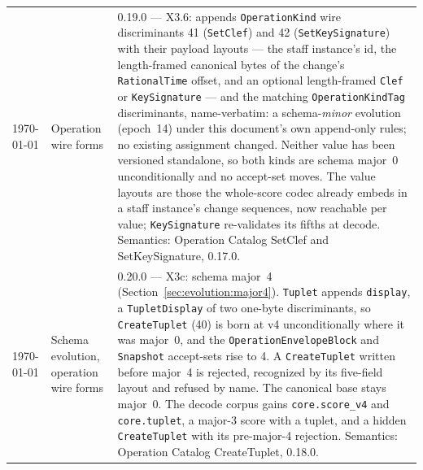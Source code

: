 \documentclass[11pt,letterpaper]{report}
\newcommand{\tablenums}[1]{{\addfontfeatures{Numbers={Lining,Tabular}}#1}}
\newcommand{\sectionsc}[1]{{\addfontfeatures{Letters=SmallCaps}#1}}
\begin{document}
\begin{longtable}{p{2cm} p{2.5cm} p{9cm}}
    \today & Operation wire forms & 0.19.0 --- X3.6: appends
  \texttt{OperationKind} wire discriminants \tablenums{41}
  (\texttt{SetClef}) and \tablenums{42} (\texttt{SetKeySignature}) with
  their payload layouts --- the staff instance's id, the length-framed
  canonical bytes of the change's \texttt{RationalTime} offset, and an
  optional length-framed \texttt{Clef} or \texttt{KeySignature} --- and the
  matching \texttt{OperationKindTag} discriminants, name-verbatim: a
  schema-\emph{minor} evolution (epoch~14) under this document's own
  append-only rules; no existing assignment changed. Neither value has been
  versioned standalone, so both kinds are schema major~0 unconditionally and
  no accept-set moves. The value layouts are those the whole-score codec
  already embeds in a staff instance's change sequences, now reachable per
  value; \texttt{KeySignature} re-validates its fifths at decode. Semantics:
  Operation Catalog \sectionsc{SetClef and SetKeySignature}, 0.17.0. \\

    \today & Schema evolution, operation wire forms & 0.20.0 --- X3c:
  schema major~4 (Section~\ref{sec:evolution:major4}). \texttt{Tuplet}
  appends \texttt{display}, a \texttt{TupletDisplay} of two one-byte
  discriminants, so \texttt{CreateTuplet} (\tablenums{40}) is born at v4
  unconditionally where it was major~0, and the
  \texttt{OperationEnvelopeBlock} and \texttt{Snapshot} accept-sets rise to
  \tablenums{4}. A \texttt{CreateTuplet} written before major~4 is rejected,
  recognized by its five-field layout and refused by name. The canonical base
  stays major~0. The decode corpus gains \texttt{core.score\_v4} and
  \texttt{core.tuplet}, a major-3 score with a tuplet, and a hidden
  \texttt{CreateTuplet} with its pre-major-4 rejection. Semantics: Operation
  Catalog \sectionsc{CreateTuplet}, 0.18.0. \\


\end{longtable}
\end{document}
